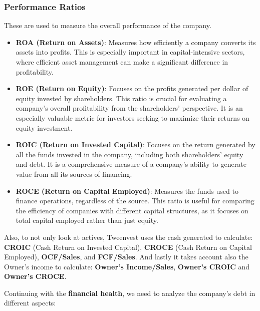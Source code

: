 \documentclass[11pt,english,a4paper,hidelinks]{book}
\begin{document}
\subsubsection{Performance Ratios}
These are used to measure the overall performance of the company.
\begin{itemize}
    \item \textbf{ROA (Return on Assets)}: Measures how efficiently a company converts its assets into profits. This is especially important in capital-intensive sectors, where efficient asset management can make a significant difference in profitability.
    
    \item \textbf{ROE (Return on Equity)}: Focuses on the profits generated per dollar of equity invested by shareholders. This ratio is crucial for evaluating a company's overall profitability from the shareholders' perspective. It is an especially valuable metric for investors seeking to maximize their returns on equity investment.
    
    \item \textbf{ROIC (Return on Invested Capital)}: Focuses on the return generated by all the funds invested in the company, including both shareholders' equity and debt. It is a comprehensive measure of a company's ability to generate value from all its sources of financing.
    
    \item \textbf{ROCE (Return on Capital Employed)}: Measures the funds used to finance operations, regardless of the source. This ratio is useful for comparing the efficiency of companies with different capital structures, as it focuses on total capital employed rather than just equity.
\end{itemize}

\noindent Also, to not only look at actives, Tweenvest uses the cash generated to calculate: \textbf{CROIC} (Cash Return on Invested Capital), \textbf{CROCE} (Cash Return on Capital Employed), \textbf{OCF/Sales}, and \textbf{FCF/Sales}. And lastly it takes account also the Owner's income to calculate: \textbf{Owner's Income/Sales}, \textbf{Owner's CROIC} and \textbf{Owner's CROCE}.

\vspace{0.5cm}
\noindent Continuing with the \textbf{financial health}, we need to analyze the company's debt in different aspects:
\end{document}
